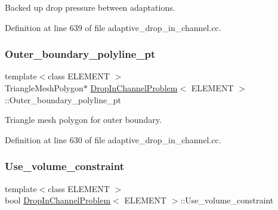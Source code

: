 Backed up drop pressure between adaptations. 



Definition at line 639 of file adaptive\+\_\+drop\+\_\+in\+\_\+channel.\+cc.

\mbox{\label{classDropInChannelProblem_aebc1a038a715fd269319b1fb091f0b26}} 
\subsubsection{\texorpdfstring{Outer\+\_\+boundary\+\_\+polyline\+\_\+pt}{Outer\_boundary\_polyline\_pt}}
{\footnotesize\ttfamily template$<$class E\+L\+E\+M\+E\+NT $>$ \\
Triangle\+Mesh\+Polygon$\ast$ \hyperlink{classDropInChannelProblem}{Drop\+In\+Channel\+Problem}$<$ E\+L\+E\+M\+E\+NT $>$\+::Outer\+\_\+boundary\+\_\+polyline\+\_\+pt\hspace{0.3cm}{\ttfamily [private]}}



Triangle mesh polygon for outer boundary. 



Definition at line 630 of file adaptive\+\_\+drop\+\_\+in\+\_\+channel.\+cc.

\mbox{\label{classDropInChannelProblem_aa555cfd96e802218280acd0165f974dd}} 
\subsubsection{\texorpdfstring{Use\+\_\+volume\+\_\+constraint}{Use\_volume\_constraint}}
{\footnotesize\ttfamily template$<$class E\+L\+E\+M\+E\+NT $>$ \\
bool \hyperlink{classDropInChannelProblem}{Drop\+In\+Channel\+Problem}$<$ E\+L\+E\+M\+E\+NT $>$\+::Use\+\_\+volume\+\_\+constraint\hspace{0.3cm}{\ttfamily [private]}}



